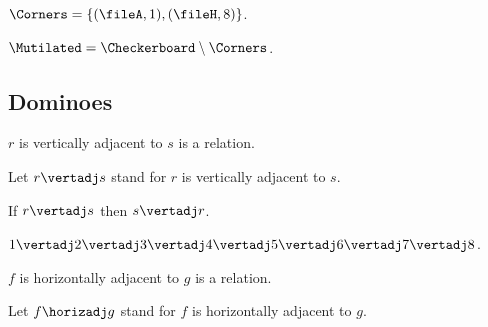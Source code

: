 \begin{forthel}
    \begin{definition}
        $\Corners = \{ (\fileA, 1), (\fileH, 8) \}$.
    \end{definition}

    \begin{definition}
        $\Mutilated = \Checkerboard \setminus \Corners$.
    \end{definition}
\end{forthel}



\subsection{Dominoes}

\begin{forthel}
    \begin{signature}
        $r$ is vertically adjacent to $s$ is a relation.
    \end{signature}
    Let $r\vertadj s$ stand for $r$ is vertically adjacent to $s$.

    \begin{axiom}
        If $r\vertadj s$ then $s\vertadj r$.
    \end{axiom}
    \begin{axiom}
        $1\vertadj 2\vertadj 3\vertadj 4\vertadj 5\vertadj 6\vertadj 7\vertadj 8$.
    \end{axiom}


    \begin{signature}
        $f$ is horizontally adjacent to $g$ is a relation.
    \end{signature}
    Let $f\horizadj g$ stand for $f$ is horizontally adjacent to $g$.


\end{forthel}
